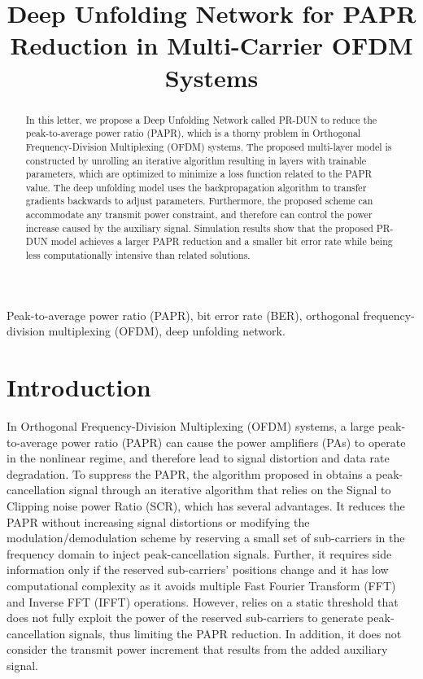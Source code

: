\documentclass[conference]{IEEEtran}
\begin{document}
\title{Deep Unfolding Network for PAPR Reduction in Multi-Carrier OFDM Systems}

\author{
}

\maketitle

\begin{abstract}
In this letter, we propose a Deep Unfolding Network called PR-DUN to reduce the peak-to-average power ratio (PAPR), which is a thorny problem in Orthogonal Frequency-Division Multiplexing (OFDM) systems. The proposed multi-layer model is constructed by unrolling an iterative algorithm resulting in layers with trainable parameters, which are optimized to minimize a loss function related to the PAPR value. The deep unfolding model uses the backpropagation algorithm to transfer gradients backwards to adjust parameters. Furthermore, the proposed scheme can accommodate any transmit power constraint, and therefore can control the power increase caused by the auxiliary signal. Simulation results show that the proposed PR-DUN model achieves a larger PAPR reduction and a smaller bit error rate while being less computationally intensive than related solutions.
\end{abstract}

\begin{IEEEkeywords}
Peak-to-average power ratio (PAPR), bit error rate (BER), orthogonal frequency-division multiplexing (OFDM), deep unfolding network.
\end{IEEEkeywords}

\section{Introduction}
In Orthogonal Frequency-Division Multiplexing (OFDM) systems, a large peak-to-average power ratio (PAPR) can cause the power amplifiers (PAs) to operate in the nonlinear regime, and therefore lead to signal distortion and data rate degradation. To suppress the PAPR, the algorithm proposed in \cite{b1} obtains a peak-cancellation signal through an iterative algorithm that relies on the Signal to Clipping noise power Ratio (SCR), which has several advantages. It reduces the PAPR without increasing signal distortions or modifying the modulation/demodulation scheme by reserving a small set of sub-carriers in the frequency domain to inject peak-cancellation signals. Further, it requires side information only if the reserved sub-carriers’ positions change and it has low computational complexity as it avoids multiple Fast Fourier Transform (FFT) and Inverse FFT (IFFT) operations. However, \cite{b1} relies on a static threshold that does not fully exploit the power of the reserved sub-carriers to generate peak-cancellation signals, thus limiting the PAPR reduction. In addition, it does not consider the transmit power increment that results from the added auxiliary signal.
\end{document}
